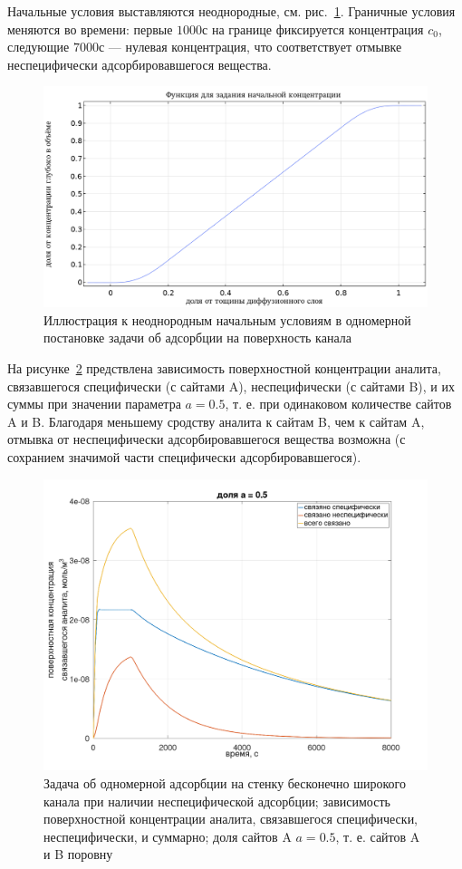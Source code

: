 \documentclass[oneside,final,12pt]{extreport}
\begin{document}
Начальные условия выставляются неоднородные,
см. рис.~\ref{fig:flat_wide_ramp_ic}.
Граничные условия меняются во времени: первые $1000\text{с}$
на границе фиксируется концентрация $c_0$,
следующие $7000\text{с}$ --- нулевая концентрация, что соответствует отмывке
неспецифически адсорбировавшегося вещества.

\begin{figure}
  \centering
  \includegraphics[width=.7\textwidth]{pic/wide_two_surf_ramp}
  
  \caption{%
    \label{fig:flat_wide_ramp_ic}%
    Иллюстрация к неоднородным начальным условиям в одномерной постановке
    задачи об адсорбции на поверхность канала
  }

\end{figure}

На рисунке~\ref{fig:flat_wide_two_surf_example} предствлена зависимость
поверхностной концентрации аналита, связавшегося специфически (с сайтами A),
неспецифически (с сайтами B), и их суммы при значении параметра $a = 0.5$,
т. е. при одинаковом количестве сайтов A и B.
Благодаря меньшему сродству аналита к сайтам B, чем к сайтам A, отмывка
от неспецифически адсорбировавшегося вещества возможна
(с сохранием значимой части специфически адсорбировавшегося).

\begin{figure}
  \centering
  \includegraphics[width=.7\textwidth]{pic/flat_wide_twosurf_example}

  \caption{%
    \label{fig:flat_wide_two_surf_example}%
    Задача об одномерной адсорбции на стенку бесконечно широкого канала
    при наличии неспецифической адсорбции;
    зависимость поверхностной концентрации аналита,
    связавшегося специфически, неспецифически, и суммарно;
    доля сайтов A $a = 0.5$, т. е. сайтов A и B поровну
  }

\end{figure}
\end{document}
